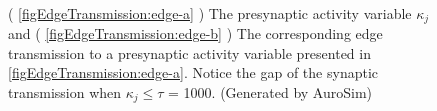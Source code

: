 \begin{figure}[hbt!p] 
	\centering
   	  \\
	\caption{ 	( \ref{figEdgeTransmission:edge-a} ) The presynaptic activity variable $\kappa_j$         and   
				( \ref{figEdgeTransmission:edge-b} ) The corresponding edge transmission to a presynaptic activity variable presented in \ref{figEdgeTransmission:edge-a}. 
			Notice the gap of the synaptic transmission when $\kappa_j \leq \tau$ = 1000.  
			(Generated by AuroSim)
			} %
	\label{figEdgeTransmission}
\end{figure}
			


